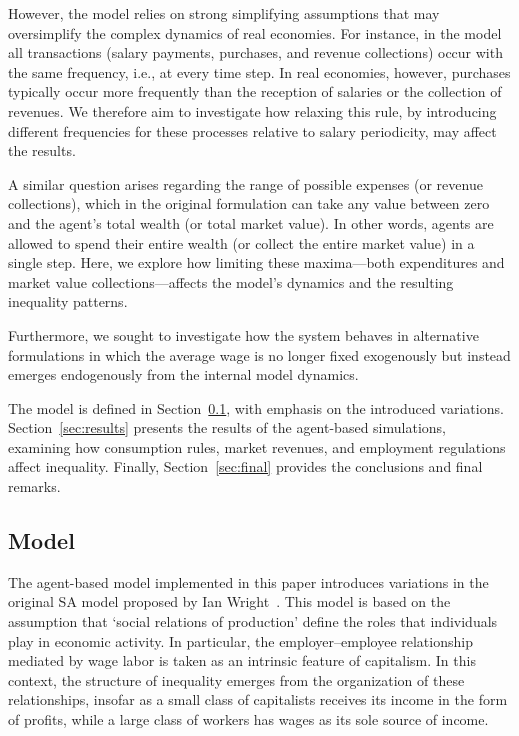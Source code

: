 However, the model relies on strong simplifying assumptions that may oversimplify the complex dynamics of real economies. For instance, in the model all transactions (salary payments, purchases, and revenue collections) occur with the same frequency, i.e., at every time step. In real economies, however, purchases typically occur more frequently than the reception of salaries or the collection of revenues. We therefore aim to investigate how relaxing this rule, by introducing different frequencies for these processes relative to salary periodicity, may affect the results.

A similar question arises regarding the range of possible expenses (or revenue collections), which in the original formulation can take any value between zero and the agent’s total wealth (or total market value). In other words, agents are allowed to spend their entire wealth (or collect the entire market value) in a single step. Here, we explore how limiting these maxima---both expenditures and market value collections---affects the model’s dynamics and the resulting inequality patterns.

Furthermore, we sought to investigate how the system behaves in alternative formulations in which the average wage is no longer fixed exogenously but instead emerges endogenously from the internal model dynamics.

The model is defined in Section~\ref{sec:model}, with emphasis on the introduced variations. Section~\ref{sec:results} presents the results of the agent-based simulations, examining how consumption rules, market revenues, and employment regulations affect inequality. Finally, Section~\ref{sec:final} provides the conclusions and final remarks.

\subsection{Model}

\label{sec:model}

The agent-based model implemented in this paper introduces variations in the original SA model proposed by Ian Wright~\cite{Wright_2005}.  This model is based on the assumption that `social relations of production' \cite{marx2013capital1} define the roles that individuals play in economic activity. In particular, the employer--employee relationship mediated by wage labor is taken as an intrinsic feature of capitalism. In this context, the structure of inequality emerges from the organization of these relationships, insofar as a small class of capitalists receives its income in the form of profits, while a large class of workers has wages as its sole source of income.

